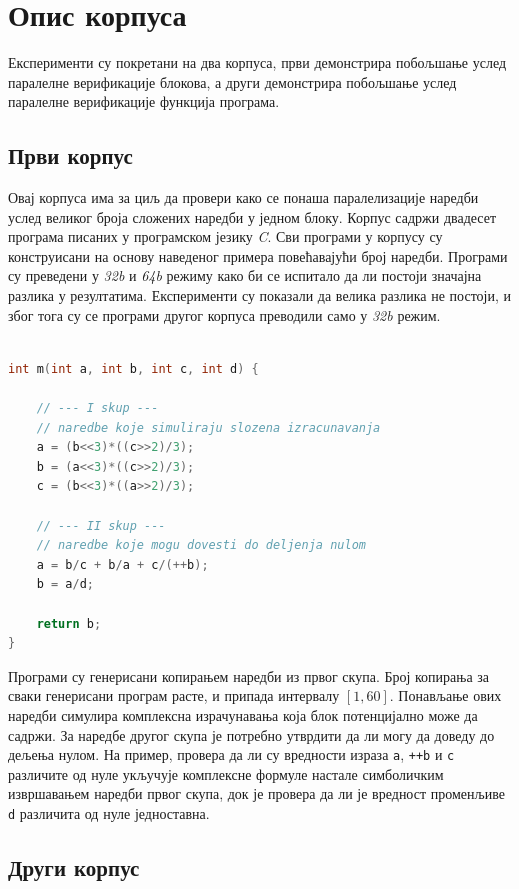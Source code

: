 \documentclass[12pt,oneside]{memoir}
\begin{document}
  \section{Опис корпуса}
  
  Експерименти су покретани на два корпуса, први демонстрира побољшање услед паралелне верификације блокова, а други демонстрира побољшање услед паралелне верификације функција програма.
  \subsection{Први корпус}
  
 Овај корпуса има за циљ да провери како се понаша паралелизације наредби услед великог броја сложених наредби у једном блоку. Корпус садржи двадесет програма писаних у програмском језику \textit{C}. Сви програми у корпусу су конструисани на основу наведеног примера повећавајући број наредби. Програми су преведени у \textit{32b} и \textit{64b} режиму како би се испитало да ли постоји значајна разлика у резултатима. Експерименти су показали да велика разлика не постоји, и због тога су се програми другог корпуса преводили само у \textit{32b} режим. 

  
\begin{lstlisting}[basicstyle=\fontsize{12}{4}\selectfont,language=C,frame=single,caption=Пример програма,label=primer1]

int m(int a, int b, int c, int d) {

	// --- I skup ---
	// naredbe koje simuliraju slozena izracunavanja
	a = (b<<3)*((c>>2)/3);
	b = (a<<3)*((c>>2)/3);
	c = (b<<3)*((a>>2)/3);

	// --- II skup --- 
	// naredbe koje mogu dovesti do deljenja nulom
	a = b/c + b/a + c/(++b);
	b = a/d;
	
	return b;
}
\end{lstlisting}
 Програми су генерисани копирањем наредби из првог скупа. Број копирања за сваки генерисани програм расте, и припада интервалу $[1,60]$. Понављање ових наредби симулира комплексна израчунавања која блок потенцијално може да садржи. За наредбе другог скупа је потребно утврдити да ли могу да доведу до дељења нулом. На пример, провера да ли су вредности израза \texttt{a}, \texttt{++b} и \texttt{c} различите од нуле укључује комплексне формуле настале симболичким извршавањем наредби првог скупа, док је провера да ли је вредност променљиве \texttt{d} различита од нуле једноставна.    


\subsection{Други корпус}
\end{document}
